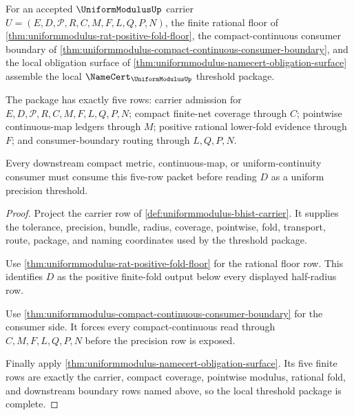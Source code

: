 \begin{theorem}
\label{thm:uniformmodulus-namecert-threshold-package}
For an accepted $\UniformModulusUp$ carrier $U=(E,D,\mathcal{P},R,C,M,F,L,Q,P,N)$, the finite rational floor of \autoref{thm:uniformmodulus-rat-positive-fold-floor}, the compact-continuous consumer boundary of \autoref{thm:uniformmodulus-compact-continuous-consumer-boundary}, and the local obligation surface of \autoref{thm:uniformmodulus-namecert-obligation-surface} assemble the local $\NameCert_{\UniformModulusUp}$ threshold package.

The package has exactly five rows: carrier admission for $E,D,\mathcal{P},R,C,M,F,L,Q,P,N$; compact finite-net coverage through $C$; pointwise continuous-map ledgers through $M$; positive rational lower-fold evidence through $F$; and consumer-boundary routing through $L,Q,P,N$.

Every downstream compact metric, continuous-map, or uniform-continuity consumer must consume this five-row packet before reading $D$ as a uniform precision threshold.
\end{theorem}
\begin{proof}
Project the carrier row of \autoref{def:uniformmodulus-bhist-carrier}. It supplies the tolerance, precision, bundle, radius, coverage, pointwise, fold, transport, route, package, and naming coordinates used by the threshold package.

Use \autoref{thm:uniformmodulus-rat-positive-fold-floor} for the rational floor row. This identifies $D$ as the positive finite-fold output below every displayed half-radius row.

Use \autoref{thm:uniformmodulus-compact-continuous-consumer-boundary} for the consumer side. It forces every compact-continuous read through $C,M,F,L,Q,P,N$ before the precision row is exposed.

Finally apply \autoref{thm:uniformmodulus-namecert-obligation-surface}. Its five finite rows are exactly the carrier, compact coverage, pointwise modulus, rational fold, and downstream boundary rows named above, so the local threshold package is complete.
\end{proof}

